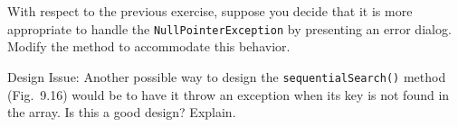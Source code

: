 \begin{EXRtwo}
\item  With respect to the previous exercise, suppose you
decide that it is more appropriate to handle the
{\tt NullPointerException} by presenting an error dialog.  Modify the method to
accommodate this behavior.

\item  Design Issue: Another possible way to design the
{\tt sequential\-Search()} method (Fig.~9.16)
would be to have it throw an exception when its key is not
found in the array.  Is this a good design? Explain.

\end{EXRtwo}

